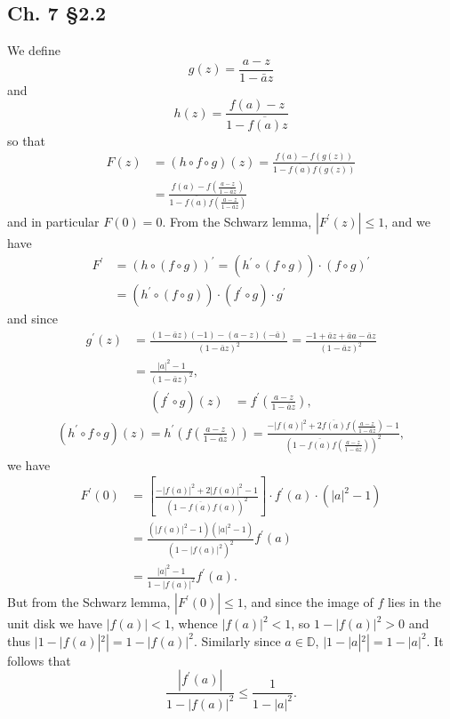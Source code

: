 \documentclass{article}
\begin{document}
\subsection{Ch. 7 \S 2.2}
We define
$$
g(z) = \frac{a - z}
            {1 - \bar{a} z}
$$
and
$$
h(z) = \frac{f(a) - z}
            {1 - \overline{f(a)} z}
$$
so that
\begin{align*}
   F(z)
&= (h \circ f \circ g)(z)
 = \frac{f(a) - f(g(z))}
        {1 - \overline{f(a)} f(g(z))} \\
&= \frac{ f(a)
        - f\left(
             \frac{a - z}
                  {1 - \bar{a} z}
           \right)}
        { 1
        - \overline{f(a)}
          f\left(
            \frac{a - z}
                 {1 - \bar{a} z}
          \right)}
\end{align*}
and in particular $F(0) = 0$. From the Schwarz lemma,
$|F^\prime(z)| \leq 1$, and we have
\begin{align*}
   F^\prime
&= (h \circ (f \circ g))^\prime
 = (h^\prime \circ (f \circ g)) \cdot (f \circ g)^\prime \\
&= (h^\prime \circ (f \circ g)) \cdot
   (f^\prime \circ g) \cdot
   g^\prime
\end{align*}
and since
\begin{align*}
  g^\prime(z)
&= \frac{(1 - \bar{a} z)(-1) - (a - z)(-\bar{a})}
        {(1 - \bar{a} z)^2}
 = \frac{-1 + \bar{a} z + \bar{a} a - \bar{a} z}
        {(1 - \bar{a} z)^2} \\
&= \frac{|a|^2 - 1}
        {(1 - \bar{a} z)^2},
\end{align*}
\begin{align*}
   (f^\prime \circ g)(z)
&= f^\prime\left(\frac{a - z}{1 - \bar{a} z}\right),
\end{align*}
\begin{align*}
  (h^\prime \circ f \circ g)(z)
= h^\prime\left(f\left(\frac{a - z}{1 - \bar{a}z}\right)\right)
= \frac{ -|f(a)|^2
       + 2 \overline{f(a)}
           f\left(\frac{a - z}{1 - \bar{a}z}\right)
       - 1}
       {\left(
          1
        - \overline{f(a)}
          f\left(\frac{a - z}{1 - \bar{a} z}\right)
        \right)^2},
\end{align*}
we have
\begin{align*}
   F^\prime(0)
&= \left[
     \frac{-|f(a)|^2 + 2|f(a)|^2 - 1}
          {(1 - \overline{f(a)} f(a))^2}
   \right]
   \cdot
   f^\prime(a)
   \cdot
   (|a|^2 - 1) \\
&= \frac{(|f(a)|^2 - 1)(|a|^2 - 1)}
         {(1 - |f(a)|^2)^2}
    f^\prime(a) \\
&= \frac{|a|^2 - 1}
        {1 - |f(a)|^2}
   f^\prime(a).
\end{align*}
But from the Schwarz lemma, $|F^\prime(0)| \leq 1$,
and since the image of $f$ lies in the unit disk we have
$|f(a)| < 1$, whence $|f(a)|^2 < 1$, so $1 - |f(a)|^2 > 0$
and thus $|1 - |f(a)|^2| = 1 - |f(a)|^2$. Similarly since
$a \in \mathbb{D}$, $|1 - |a|^2| = 1 - |a|^2$. It follows
that
$$
     \frac{|f^\prime(a)|}
          {1 - |f(a)|^2}
\leq \frac{1}{1 - |a|^2}.
$$
\end{document}
